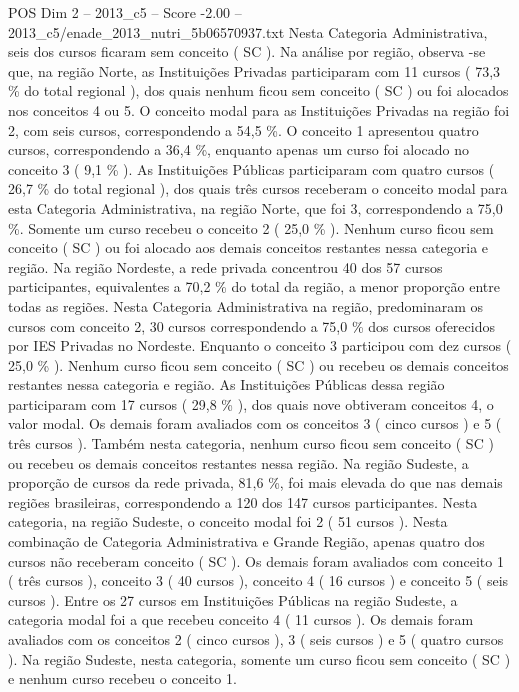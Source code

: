 \begin{textsample}{POS Dim 2 – 2013\_c5 – Score -2.00 – 2013\_c5/enade\_2013\_nutri\_5b06570937.txt}
Nesta Categoria Administrativa, seis dos cursos ficaram sem conceito ( SC ).
Na análise por região, observa -se que, na região Norte, as Instituições Privadas participaram com 11 cursos ( 73,3 \% do total regional ), dos quais nenhum ficou sem conceito ( SC ) ou foi alocados nos conceitos 4 ou 5.
O conceito modal para as Instituições Privadas na região foi 2, com seis cursos, correspondendo a 54,5 \%.
O conceito 1 apresentou quatro cursos, correspondendo a 36,4 \%, enquanto apenas um curso foi alocado no conceito 3 ( 9,1 \% ).
As Instituições Públicas participaram com quatro cursos ( 26,7 \% do total regional ), dos quais três cursos receberam o conceito modal para esta Categoria Administrativa, na região Norte, que foi 3, correspondendo a 75,0 \%.
Somente um curso recebeu o conceito 2 ( 25,0 \% ).
Nenhum curso ficou sem conceito ( SC ) ou foi alocado aos demais conceitos restantes nessa categoria e região.
Na região Nordeste, a rede privada concentrou 40 dos 57 cursos participantes, equivalentes a 70,2 \% do total da região, a menor proporção entre todas as regiões.
Nesta Categoria Administrativa na região, predominaram os cursos com conceito 2, 30 cursos correspondendo a 75,0 \% dos cursos oferecidos por IES Privadas no Nordeste.
Enquanto o conceito 3 participou com dez cursos ( 25,0 \% ).
Nenhum curso ficou sem conceito ( SC ) ou recebeu os demais conceitos restantes nessa categoria e região.
As Instituições Públicas dessa região participaram com 17 cursos ( 29,8 \% ), dos quais nove obtiveram conceitos 4, o valor modal.
Os demais foram avaliados com os conceitos 3 ( cinco cursos ) e 5 ( três cursos ).
Também nesta categoria, nenhum curso ficou sem conceito ( SC ) ou recebeu os demais conceitos restantes nessa região.
Na região Sudeste, a proporção de cursos da rede privada, 81,6 \%, foi mais elevada do que nas demais regiões brasileiras, correspondendo a 120 dos 147 cursos participantes.
Nesta categoria, na região Sudeste, o conceito modal foi 2 ( 51 cursos ).
Nesta combinação de Categoria Administrativa e Grande Região, apenas quatro dos cursos não receberam conceito ( SC ).
Os demais foram avaliados com conceito 1 ( três cursos ), conceito 3 ( 40 cursos ), conceito 4 ( 16 cursos ) e conceito 5 ( seis cursos ).
Entre os 27 cursos em Instituições Públicas na região Sudeste, a categoria modal foi a que recebeu conceito 4 ( 11 cursos ).
Os demais foram avaliados com os conceitos 2 ( cinco cursos ), 3 ( seis cursos ) e 5 ( quatro cursos ).
Na região Sudeste, nesta categoria, somente um curso ficou sem conceito ( SC ) e nenhum curso recebeu o conceito 1.

\end{textsample}
